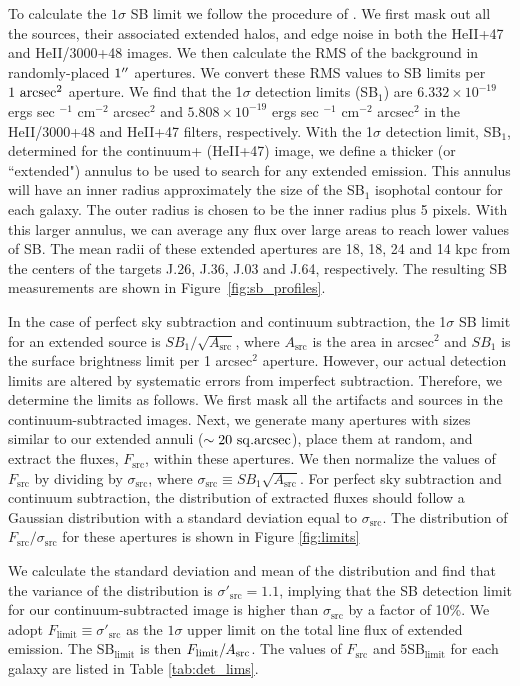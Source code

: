 \documentclass[twocolumn]{aastex62}
\begin{document}
To calculate the $1\sigma$ SB limit we follow the procedure of \cite{Battaia_2015}. We first mask out all the sources, their associated extended halos, and edge noise in both the HeII+47 and HeII/3000+48 images. We then calculate the RMS of the background in randomly-placed $1\mbox{$^{\prime\prime}$}$ apertures. We convert these RMS values to SB limits per $1~\rm arcsec^2$  aperture. We find that the 1$\sigma$ detection limits (SB$_1$) are $6.332\times10^{-19}$ ergs sec $^{-1}$ cm$^{-2}$ arcsec$^2$ and $5.808\times10^{-19} $ ergs sec $^{-1}$ cm$^{-2}$ arcsec$^2$ in the HeII/3000+48 and HeII+47 filters, respectively. 
With the 1$\sigma$ detection limit, SB$_1$, determined for the continuum+ (HeII+47) image, we define a thicker (or ``extended") annulus to be used to search for any extended  emission. This annulus will have an inner radius approximately the size of the SB$_1$ isophotal contour for each galaxy. The outer radius is chosen to be the inner radius plus 5 pixels. With this larger annulus, we can average any flux over large areas to reach lower values of SB. The mean radii of these extended apertures are 18, 18, 24 and 14 kpc from the centers of the targets J.26, J.36, J.03 and J.64, respectively. The resulting SB measurements are shown in Figure~\ref{fig:sb_profiles}.

In the case of perfect sky subtraction and continuum subtraction, the 1$\sigma$ SB limit for an extended source is $SB_{1}/\sqrt{A_\text{src}}$, where $A_\text{src}$ is the area in arcsec$^2$ and $SB_{1}$ is the surface brightness limit per 1 arcsec$^2$ aperture. However, our actual detection limits are altered by systematic errors from imperfect subtraction. Therefore, we determine the limits as follows. 
We first mask all the artifacts and sources in the continuum-subtracted images. Next, we generate many apertures with sizes similar to our extended annuli ($\sim 20 \rm\ sq.arcsec$), place them at random, and extract the fluxes, $F_{\text{src}}$, within these apertures. We then normalize the values of $F_{\text{src}}$ by dividing by $\sigma_{\text{src}}$, where $\sigma_{\text{src}} \equiv SB_{1}\sqrt{A_\text{src}}$. For perfect sky subtraction and continuum subtraction, the distribution of extracted fluxes should follow a Gaussian distribution with a standard deviation equal to $\sigma_{\text{src}}$. The distribution of $F_{\text{src}}/\sigma_{\text{src}}$ for these apertures is shown in Figure \ref{fig:limits}

We calculate the standard deviation and mean of the distribution and find that the variance of the distribution is $\sigma'_{\text{src}}=1.1$, implying that the SB detection limit for our continuum-subtracted image is higher than $\sigma_{\text{src}}$ by a factor of 10\%. We adopt $F_{\text{limit}} \equiv \sigma'_{\text{src}}$  as the $1 \sigma$ upper limit on the total line flux of extended  emission. The SB$_{\text{limit}}$ is then $F_{\text{limit}}/A_{\rm{src}}$. The values of $F_{\text{src}}$ and 5SB$_{\text{limit}}$ for each galaxy are listed in Table \ref{tab:det_lims}.
\end{document}
